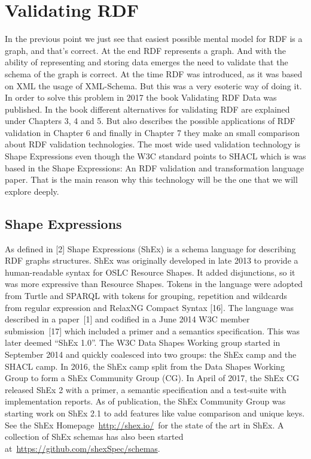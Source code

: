 \section{Validating RDF}
In the previous point we just see that easiest possible mental model for RDF is a graph, and that’s correct. At the end RDF represents a graph. And with the ability of representing and storing data emerges the need to validate that the schema of the graph is correct.
At the time RDF was introduced, as it was based on XML the usage of XML-Schema. But this was a very esoteric way of doing it. In order to solve this problem in 2017 the book Validating RDF Data  was published.
In the book different alternatives for validating RDF are explained under Chapters 3, 4 and 5. But also describes the possible applications of RDF validation in Chapter 6 and finally in Chapter 7 they make an small comparison about RDF validation technologies.
The most wide used validation technology is Shape Expressions even though the W3C standard points to SHACL which is was based in the Shape Expressions: An RDF validation and transformation language  paper. That is the main reason why this technology will be the one that we will explore deeply.

\subsection{Shape Expressions} 
As defined in [2] Shape Expressions (ShEx) is a schema language for describing RDF graphs structures. ShEx was originally developed in late 2013 to provide a human-readable syntax for OSLC Resource Shapes. It added disjunctions, so it was more expressive than Resource Shapes. Tokens in the language were adopted from Turtle and SPARQL with tokens for grouping, repetition and wildcards from regular expression and RelaxNG Compact Syntax [16]. The language was described in a paper [1] and codified in a June 2014 W3C member submission [17] which included a primer and a semantics specification. This was later deemed “ShEx 1.0”.
The W3C Data Shapes Working group started in September 2014 and quickly coalesced into two groups: the ShEx camp and the SHACL camp. In 2016, the ShEx camp split from the Data Shapes Working Group to form a ShEx Community Group (CG). In April of 2017, the ShEx CG released ShEx 2 with a primer, a semantic specification and a test-suite with implementation reports.
As of publication, the ShEx Community Group was starting work on ShEx 2.1 to add features like value comparison and unique keys. See the ShEx Homepage \url{http://shex.io/} for the state of the art in ShEx. A collection of ShEx schemas has also been started at \url{https://github.com/shexSpec/schemas}.

